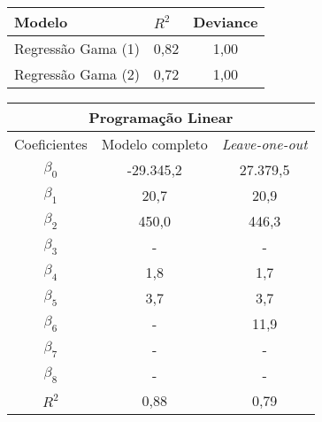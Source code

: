 \documentclass{article}
\begin{document}
\begin{table}[]
	\centering
	\begin{tabular}{lcc}
		\hline
		\textbf{Modelo}    & \multicolumn{1}{l}{$R^{2}$} & \textbf{Deviance} \\ \hline
		Regressão Gama (1) & 0,82                        & 1,00              \\
		Regressão Gama (2) & 0,72                        & 1,00              \\ \hline
	\end{tabular}
\end{table}

\begin{table}[]
	\centering
	\begin{tabular}{ccc}
		\hline
		\multicolumn{3}{c}{\textbf{Programação Linear}}                             \\ \hline
		\multicolumn{1}{l}{Coeficientes} & Modelo completo & \textit{Leave-one-out} \\ \hline
		$\beta_0$                        & -29.345,2       & 27.379,5               \\
		$\beta_1$                        & 20,7           & 20,9                   \\
		$\beta_2$                        & 450,0           & 446,3                  \\
		$\beta_3$                        & -             & -                   \\
		$\beta_4$                        & 1,8             & 1,7                   \\
		$\beta_5$                        & 3,7             & 3,7                    \\
		$\beta_6$                        & -             & 11,9              \\
		$\beta_7$                        & -             & -                   \\
		$\beta_8$                        & -             & -                   \\ \hline
		$R^{2}$                          & 0,88             & 0,79                    \\ \hline  \hline
	\end{tabular}
\end{table}
\end{document}
